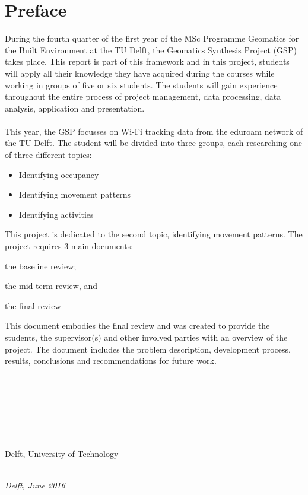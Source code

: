 \chapter*{Preface}
During the fourth quarter of the first year of the MSc Programme Geomatics for the Built Environment at the TU Delft, the Geomatics Synthesis Project (GSP) takes place. This report is part of this framework and in this project, students will apply all their knowledge they have acquired during the courses while working in groups of five or six students. The students will gain experience throughout the entire process of project management, data processing, data analysis, application and presentation. \\\\
This year, the GSP focusses on Wi-Fi tracking data from the eduroam network of the TU Delft. The student will be divided into three groups, each researching one of three different topics:
\begin{itemize}
\item Identifying occupancy
\item Identifying movement patterns
\item Identifying activities
\end{itemize}
This project is dedicated to the second topic, identifying movement patterns. The project requires 3 main documents: \begin {enumerate*} [label=\itshape\arabic*\upshape),font={\color{red!0!black}\bfseries}] \item the baseline review; \item the mid term review, and \item the final review
\end{enumerate*}
This document embodies the final review and was created to provide the students, the supervisor(s) and other involved parties with an overview of the project. The document includes the problem description, development process, results, conclusions and recommendations for future work.
\\\\
\\\\
\\\\
\\\\
Delft, University of Technology\\

\begin{flushright}
{\makeatletter\itshape
    \@author\\
    Delft, June 2016
\makeatother}
\end{flushright}

